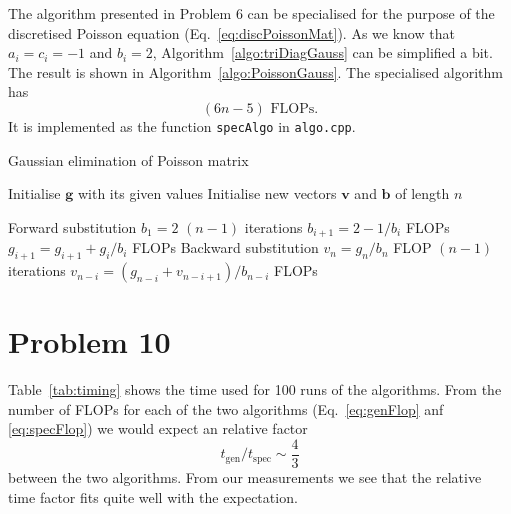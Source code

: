 \documentclass[english,notitlepage,aps,pra,10pt]{revtex4-2}
\newcommand{\bv}[1]{\mathbf{#1}}
\begin{document}
The algorithm presented in Problem 6 can be specialised for the purpose of the discretised Poisson equation (Eq.~\ref{eq:discPoissonMat}). As we know that $a_i = c_i = -1$ and $b_i = 2$, Algorithm~\ref{algo:triDiagGauss} can be simplified a bit. The result is shown in Algorithm~\ref{algo:PoissonGauss}. The specialised algorithm has
\begin{equation}
    (6n-5) \textrm{ FLOPs}.
    \label{eq:specFlop}
\end{equation}
It is implemented as the function \verb+specAlgo+ in \verb+algo.cpp+. 
\begin{algorithm}[H]
    \caption{Gaussian elimination of Poisson matrix}\label{algo:PoissonGauss}
    \begin{algorithmic}
        \State Initialise $\bv{g}$ with its given values
        \State Initialise new vectors $\bv{v}$ and $\bv{b}$ of length $n$ 

        \Comment Forward substitution
        \State $b_1 = 2$
                                \Comment $(n-1)$ iterations
            \State $b_{i+1} = 2 - 1/b_i$                     FLOPs 
            \State $g_{i+1} = g_{i+1} + g_{i}/b_{i}$         FLOPs 
        \EndFor
        \Comment Backward substitution
        \State $v_n = g_n/b_n$                               FLOP 
                                \Comment $(n-1)$ iterations
            \State $v_{n-i} = (g_{n-i} + v_{n-i+1})/b_{n-i}$   FLOPs
        \EndFor
    \end{algorithmic}
\end{algorithm}


\section*{Problem 10}

Table~\ref{tab:timing} shows the time used for 100 runs of the algorithms. From the number of FLOPs for each of the two algorithms (Eq.~\ref{eq:genFlop} anf \ref{eq:specFlop}) we would expect an relative factor
\begin{equation}
    t_\mathrm{gen}/t_\mathrm{spec} \sim \frac{4}{3}
\end{equation}
between the two algorithms. From our measurements we see that the relative time factor fits quite well with the expectation.
\end{document}
